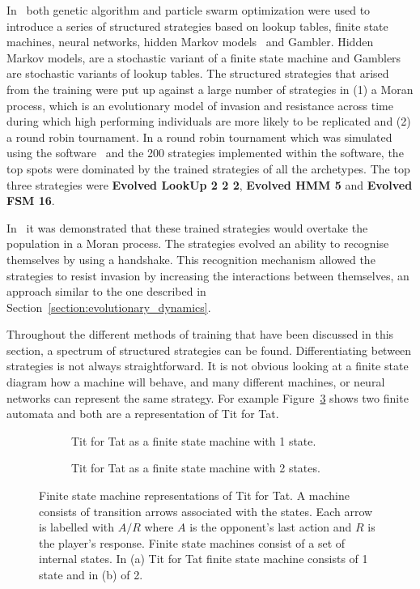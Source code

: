 In~\cite{Knight2017, KnightHGC17} both genetic algorithm and particle swarm
optimization were used to introduce a series of structured strategies based on
lookup tables, finite state machines, neural networks, hidden Markov
models~\cite{eddy1996} and Gambler. Hidden Markov models, are a stochastic
variant of a finite state machine and Gamblers are stochastic variants of lookup
tables. The structured strategies that arised from the training were put up
against a large number of strategies in (1) a Moran process, which is an
evolutionary model of invasion and resistance across time during which high
performing individuals are more likely to be replicated and (2)
a round robin tournament. In a round robin tournament which was simulated using the
software~\cite{axelrodproject} and the 200 strategies implemented within the
software, the top spots were dominated by the trained strategies of all the
archetypes. The top three strategies were \textbf{Evolved
LookUp 2 2 2}, \textbf{Evolved HMM 5} and \textbf{Evolved FSM 16}.

In~\cite{KnightHGC17} it was demonstrated that these trained strategies
would overtake the population in a Moran process. The strategies evolved an ability
to recognise themselves by using a handshake. This recognition mechanism allowed the strategies
to resist invasion by increasing the interactions between themselves, an approach
similar to the one described in Section~\ref{section:evolutionary_dynamics}.

Throughout the different methods of training that have been discussed in this
section, a spectrum of structured strategies can be found. Differentiating
between strategies is not always straightforward. It is not obvious looking at a
finite state diagram how a machine will behave, and many different machines, or
neural networks can represent the same strategy. For example
Figure~\ref{fig:machine_tft} shows two finite automata and both are a
representation of Tit for Tat.

\begin{figure}[!hbtp]
    \begin{subfigure}{.45\textwidth}\centering
        
        \caption{Tit for Tat as a finite state machine with 1 state.}\label{fig:representation_a}
    \end{subfigure}
    \begin{subfigure}{.45\textwidth}\centering
        
        \caption{Tit for Tat as a finite state machine with 2 states.}\label{fig:representation_b}
     \end{subfigure}
     \caption{Finite state machine representations of Tit for Tat. A machine
     consists of transition arrows associated with the states. Each arrow is
     labelled with \(A/R\) where \(A\) is the opponent's last action and \(R\)
     is the player's response. Finite state machines consist of a set of
     internal states. In (a) Tit for Tat finite state
     machine consists of 1 state and in (b) of 2.}\label{fig:machine_tft}
\end{figure}

